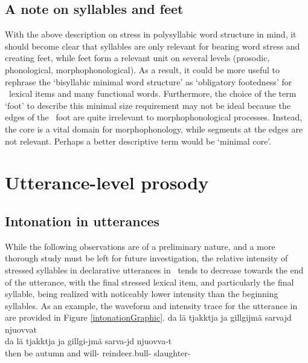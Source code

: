 \subsection{A note on syllables and feet}\label{footedness}
With the above description on stress in polysyllabic word structure in mind, it should become clear that syllables are only relevant for bearing word stress and creating feet, while feet form a relevant unit on several levels (prosodic, phonological, morphophonological). As a result, it could be more useful to rephrase the ‘bisyllabic minimal word structure’ as ‘obligatory footedness’ for \PS\ lexical items and many functional words. Furthermore, the choice of the term ‘foot’ to describe this minimal size requirement may not be ideal because the edges of the \PS\ foot are quite irrelevant to morphophonological processes. Instead, the  core is a vital domain for morphophonology, while segments at the edges are not relevant. Perhaps a better descriptive term would be ‘minimal core’.


\section{Utterance-level prosody}\label{utteranceProsody}

\subsection{Intonation in utterances}\label{utteranceIntonation}
While the following observations are of a preliminary nature, and a more thorough study must be left for future investigation, the relative intensity of stressed syllables in declarative utterances in \PS\ tends to decrease towards the end of the utterance, with the final stressed lexical item, and particularly the final syllable, being realized with noticeably lower intensity than the beginning syllables. As an example, the waveform and intensity trace for the utterance in  are provided in Figure \vref{intonationGraphic}. %
\ea\label{intonationDropEx}
\glll	da lä tjakktja ja gillgijmä sarvajd njuovvat\\
	da lä tjakktja ja gillgi-jmä sarva-jd njuovva-t\\
	then be\BS{} autumn\BS{} and will- reindeer.bull- slaughter-\\\nopagebreak
{} 
\z 
\setlength\fboxrule{0pt}

